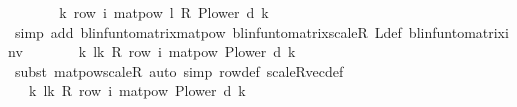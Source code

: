 \begin{isabellebody}
\ \ \isamarkupfalse%
\ \isamarkupfalse%
\ {\isachardoublequoteopen}{\isasymdots}\ {\isacharequal}{\kern0pt}\ {\isacharparenleft}{\kern0pt}{\isasymSum}k{\isachardot}{\kern0pt}\ row\ i\ {\isacharparenleft}{\kern0pt}matpow\ {\isacharparenleft}{\kern0pt}l\ {\isacharasterisk}{\kern0pt}\isactrlsub R\ {\isacharparenleft}{\kern0pt}P{\isacharunderscore}{\kern0pt}lower\ d{\isacharparenright}{\kern0pt}{\isacharparenright}{\kern0pt}\ k{\isacharparenright}{\kern0pt}{\isacharparenright}{\kern0pt}{\isachardoublequoteclose}\isanewline
\ \ \ \ \isamarkupfalse%
\ {\isacharparenleft}{\kern0pt}simp\ add{\isacharcolon}{\kern0pt}\ blinfun{\isacharunderscore}{\kern0pt}to{\isacharunderscore}{\kern0pt}matrix{\isacharunderscore}{\kern0pt}matpow\ blinfun{\isacharunderscore}{\kern0pt}to{\isacharunderscore}{\kern0pt}matrix{\isacharunderscore}{\kern0pt}scaleR\ {\isasymP}\isactrlsub L{\isacharunderscore}{\kern0pt}def\ blinfun{\isacharunderscore}{\kern0pt}to{\isacharunderscore}{\kern0pt}matrix{\isacharunderscore}{\kern0pt}inv{\isacharparenright}{\kern0pt}\isanewline
\ \ \isamarkupfalse%
\ \isamarkupfalse%
\ {\isachardoublequoteopen}{\isasymdots}\ {\isacharequal}{\kern0pt}\ {\isacharparenleft}{\kern0pt}{\isasymSum}k{\isachardot}{\kern0pt}\ l{\isacharcircum}{\kern0pt}k\ {\isacharasterisk}{\kern0pt}\isactrlsub R\ row\ i\ {\isacharparenleft}{\kern0pt}matpow\ {\isacharparenleft}{\kern0pt}{\isacharparenleft}{\kern0pt}P{\isacharunderscore}{\kern0pt}lower\ d{\isacharparenright}{\kern0pt}{\isacharparenright}{\kern0pt}\ k{\isacharparenright}{\kern0pt}{\isacharparenright}{\kern0pt}{\isachardoublequoteclose}\isanewline
\ \ \ \ \isamarkupfalse%
\ {\isacharparenleft}{\kern0pt}subst\ matpow{\isacharunderscore}{\kern0pt}scaleR{\isacharparenright}{\kern0pt}\ {\isacharparenleft}{\kern0pt}auto\ simp{\isacharcolon}{\kern0pt}\ row{\isacharunderscore}{\kern0pt}def\ scaleR{\isacharunderscore}{\kern0pt}vec{\isacharunderscore}{\kern0pt}def{\isacharparenright}{\kern0pt}\ \isanewline
\ \ \isamarkupfalse%
\ \isamarkupfalse%
\ {\isachardoublequoteopen}{\isasymdots}\ {\isacharequal}{\kern0pt}\ {\isacharparenleft}{\kern0pt}{\isasymSum}k{\isachardot}{\kern0pt}\ l{\isacharcircum}{\kern0pt}k\ {\isacharasterisk}{\kern0pt}\isactrlsub R\ row\ i\ {\isacharparenleft}{\kern0pt}matpow\ {\isacharparenleft}{\kern0pt}{\isacharparenleft}{\kern0pt}P{\isacharunderscore}{\kern0pt}lower\ d{\isacharprime}{\kern0pt}{\isacharparenright}{\kern0pt}{\isacharparenright}{\kern0pt}\ k{\isacharparenright}{\kern0pt}{\isacharparenright}{\kern0pt}{\isachardoublequoteclose}\isanewline

\end{isabellebody}
